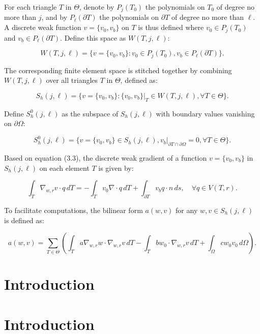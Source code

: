 \documentclass[12pt]{article} %
\begin{document}
For each triangle \(T\) in \(\Theta\), denote by \(P_j(T_0)\) the polynomials on \(T_0\) of degree no more than \(j\), and by \(P_\ell(\partial T)\) the polynomials on \(\partial T\) of degree no more than \(\ell\). A discrete weak function \(v = \{v_0, v_b\}\) on \(T\) is thus defined where \(v_0 \in P_j(T_0)\) and \(v_b \in P_\ell(\partial T)\). Define this space as \(W(T, j, \ell)\):

\begin{equation}
    W(T, j, \ell) = \{v = \{v_0, v_b\} : v_0 \in P_j(T_0), v_b \in P_\ell(\partial T)\}.
\end{equation}

The corresponding finite element space is stitched together by combining \(W(T, j, \ell)\) over all triangles \(T\) in \(\Theta\), defined as:

\begin{equation}
    S_h(j, \ell) = \{v = \{v_0, v_b\} : \{v_0, v_b\}|_T \in W(T, j, \ell), \forall T \in \Theta\}.
\end{equation}

Define \(S^0_h(j, \ell)\) as the subspace of \(S_h(j, \ell)\) with boundary values vanishing on \(\partial\Omega\):

\begin{equation}
    S^0_h(j, \ell) = \{v = \{v_0, v_b\} \in S_h(j, \ell), v_b|_{\partial T \cap \partial \Omega} = 0, \forall T \in \Theta\}.
\end{equation}

Based on equation (3.3), the discrete weak gradient of a function \(v = \{v_0, v_b\}\) in \(S_h(j, \ell)\) on each element \(T\) is given by:

\begin{equation}
    \int_T \nabla_{w,r}v \cdot q \, dT = -\int_T v_0 \nabla \cdot q \, dT + \int_{\partial T} v_b q \cdot n \, ds, \quad \forall q \in V(T, r).
\end{equation}

To facilitate computations, the bilinear form \(a(w, v)\) for any \(w, v \in S_h(j, \ell)\) is defined as:

\begin{equation}
    a(w, v) = \sum_{T \in \Theta} \left( \int_T a \nabla_{w,r} w \cdot \nabla_{w,r} v \, dT - \int_T b w_0 \cdot \nabla_{w,r} v \, dT + \int_\Omega c w_0 v_0 \, d\Omega \right).
\end{equation}
\section{Introduction}
\section{Introduction}
\end{document}
